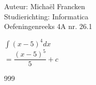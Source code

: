 \documentclass[a4paper]{article}
\newcommand{\dint}{\displaystyle\int}
\begin{document}
\noindent \large Auteur: Michaël Francken \\
\noindent \large Studierichting: Informatica\\
\noindent \large Oefeningenreeks 4A nr. 26.1\\

\medskip

\normalsize

$\dint\left(x-5\right)^4 dx$\\

$=\dfrac{(x-5)^5}{5}+c$\\



\begin{thebibliography}{999}
\end{thebibliography}
\end{document}
